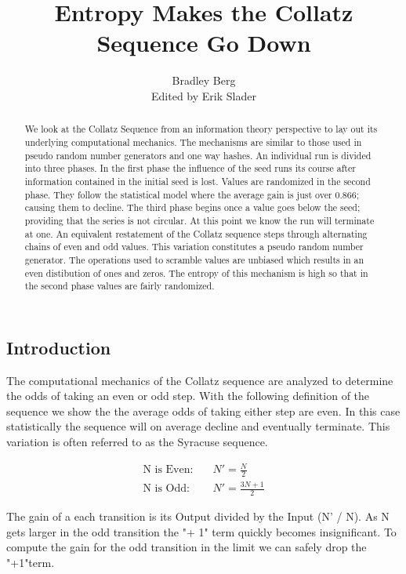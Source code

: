 \documentclass[letterpaper]{article}
\title{Entropy Makes the Collatz Sequence Go Down}
\author{Bradley Berg\\Edited by Erik Slader}
\begin{document}
\maketitle

\begin{multicols}{2}

    \begin{abstract}
        We look at the Collatz Sequence from an information theory perspective to lay out its underlying computational mechanics. The mechanisms are similar to those used in pseudo random number generators and one way hashes.
        An individual run is divided into three phases.  In the first phase the influence of the seed runs its course after information contained in the initial seed is lost.  Values are randomized in the second phase.  They follow the statistical model where the average gain is just over 0.866; causing them to decline.  The third phase begins once a value goes below the seed; providing that the series is not circular.  At this point we know the run will terminate at one.
        An equivalent restatement of the Collatz sequence steps through alternating chains of even and odd values.  This variation constitutes a pseudo random number generator.  The operations used to scramble values are unbiased which results in an even distibution of ones and zeros.  The entropy of this mechanism is high so that in the second phase values are fairly randomized.
    \end{abstract}

    \section{Introduction}


    The computational mechanics of the Collatz sequence are analyzed to determine the odds of taking an even or odd step. With the following definition of the sequence we show the the average odds of taking either step are even. In this case statistically the sequence will on average decline and eventually terminate. This variation is often referred to as the Syracuse sequence.

    \begin{align*}
        \text{N is Even:} & \quad N' = \frac{N}{2}      \\
        \text{N is Odd:}  & \quad N' = \frac{3N + 1}{2}
    \end{align*}

    The gain of a each transition is its Output divided by the Input (N' / N). As N gets larger in the odd transition the "+ 1" term quickly becomes insignificant. To compute the gain for the odd transition in the limit we can safely drop the "+1"term.


\end{multicols}
\end{document}
